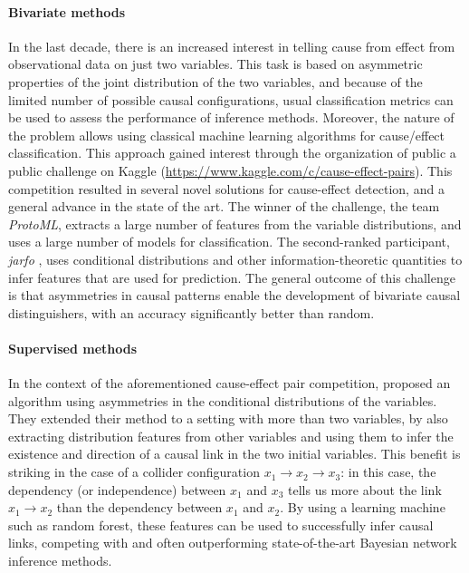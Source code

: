 \paragraph{Bivariate methods} In the last decade, there is an increased interest
in telling cause from effect from observational data on just two variables. This
task is based on asymmetric properties of the joint distribution of the two
variables, and because of the limited number of possible causal configurations,
usual classification metrics can be used to assess the performance of inference
methods. Moreover, the nature of the problem allows using classical machine
learning algorithms for cause/effect classification. This approach gained
interest through the organization of public a public challenge on Kaggle
(\url{https://www.kaggle.com/c/cause-effect-pairs}). This competition resulted
in several novel solutions for cause-effect detection, and a general advance in
the state of the art. The winner of the challenge, the team \emph{ProtoML},
extracts a large number of features from the variable distributions, and uses a
large number of models for classification. The second-ranked participant,
\emph{jarfo} \cite{fonollosa2016conditional}, uses conditional distributions and
other information-theoretic quantities to infer features that are used for
prediction. The general outcome of this challenge is that asymmetries in causal
patterns enable the development of bivariate causal distinguishers, with an
accuracy significantly better than random.

\paragraph{Supervised methods} In the context of the aforementioned cause-effect
pair competition, \textcite{bontempi2015dependency} proposed
an algorithm using asymmetries in the conditional distributions of the
variables. They extended their method to a setting with more than two variables,
by also extracting distribution features from other variables and using them to
infer the existence and direction of a causal link in the two initial variables.
This benefit is striking in the case of a collider configuration $x_1 \to x_2
\to x_3$: in this case, the dependency (or independence) between $x_1$ and
$x_3$ tells us more about the link $x_1 \to x_2$ than the dependency between
$x_1$ and $x_2$. By using a learning machine such as random forest, these
features can be used to successfully infer causal links, competing with and
often outperforming state-of-the-art Bayesian network inference methods.
